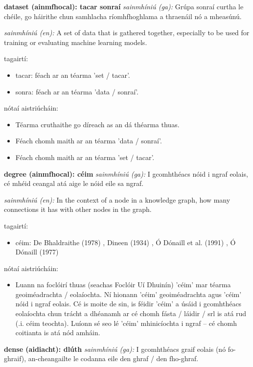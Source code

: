 \documentclass{article}
\begin{document}
\textbf{dataset (ainmfhocal): tacar sonraí}
\textit{sainmhíniú (ga):} Grúpa sonraí curtha le chéile, go háirithe chun samhlacha ríomhfhoghlama a thraenáil nó a mheasúnú.

\textit{sainmhíniú (en):} A set of data that is gathered together, especially to be used for training or evaluating machine learning models.

tagairtí:
\begin{itemize}
	\item tacar: féach ar an téarma 'set / tacar'.
	\item sonra: féach ar an téarma 'data / sonraí'.
\end{itemize}

nótaí aistriúcháin:
\begin{itemize}
	\item Téarma cruthaithe go díreach as an dá théarma thuas.
	\item Féach chomh maith ar an téarma 'data / sonraí'.
	\item Féach chomh maith ar an téarma 'set / tacar'.
\end{itemize}


\textbf{degree (ainmfhocal): céim}
\textit{sainmhíniú (ga):} I gcomhthéacs nóid i ngraf eolais, cé mhéid ceangal atá aige le nóid eile sa ngraf.

\textit{sainmhíniú (en):} In the context of a node in a knowledge graph, how many connections it has with other nodes in the graph.

tagairtí:
\begin{itemize}
	\item céim: De Bhaldraithe (1978) \cite{de-bhaldraithe}, Dineen (1934) \cite{dineen}, Ó Dónaill et al. (1991) \cite{focloir-beag}, Ó Dónaill (1977) \cite{odonaill}
\end{itemize}

nótaí aistriúcháin:
\begin{itemize}
	\item Luann na foclóirí thuas (seachas Foclóir Uí Dhuinín) 'céim' mar téarma geoiméadrachta / eolaíochta. Ní hionann 'céim' geoiméadrachta agus 'céim' nóid i ngraf eolais. Cé is moite de sin, is féidir 'céim' a úsáid i gcomhthéacs eolaíochta chun trácht a dhéanamh ar cé chomh fásta / láidir / srl is atá rud (.i. céim teochta). Luíonn sé seo lé 'céim' mhinicíochta i ngraf -- cé chomh coitianta is atá nód amháin.
\end{itemize}


\textbf{dense (aidiacht): dlúth}
\textit{sainmhíniú (ga):} I gcomhthéacs graif eolais (nó fo-ghraif), an-cheangailte le codanna eile den ghraf / den fho-ghraf.
\end{document}
